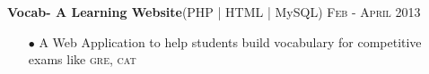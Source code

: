 \documentclass[letterpaper,11pt]{article}
\begin{document}
\normalsize{\textbf{Vocab- A Learning Website}(PHP | HTML | MySQL)} \hfill{\textsc{Feb - April 2013}}
{
\begin{itemize}\setlength{\itemsep}{-1pt}
        \item [$\bullet$] A Web Application to help students build vocabulary for competitive exams like \textsc{gre, cat}\\[-3mm]
 \end{itemize}
}
\begin{comment}



\section{Achievements}
{
        $\bullet$ Selected in \textbf{Technovate-2014}(Innovation Fair at Samsung) for developing Smart Video Player. \\
        $\bullet$ Earned \textbf{ “Thank You Star”} (Reward) for doing excellent job in team \textbf{Office TG Samsung}.\\
        $\bullet$ Attained \textbf{AIR-15196} in AIEEE 2010.
}


\section{Roles}
{      $\bullet$ Member of Cafeteria Quality Management Committee at Samsung (2015) \\
        $\bullet$ \textbf{Teaching Assistant} of Data structures and Algorithm Course -  \textsc{da-iict}(2013) \\
        $\bullet$ \textbf{Coordinator} of Event Mr.\& Miss Synapse (Annual Techno cultural festival\textsc{da-iict})(2013)\\
        $\bullet$ \textbf{Coordinator}of Event Tech-Imagine Synapse(Annual Techno cultural festival\textsc{da-iict})(2012)
}

\section{Hobbies}
{      Astronomy, Physics, Watching Documentaries, Playing Badminton\& Carrom.\\
}
\end{comment}
\end{document}
